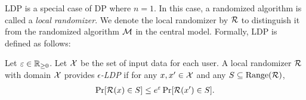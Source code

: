LDP \cite{Kasiviswanathan_FOCS08} is a special case of DP where $n=1$. 
In this case, a randomized algorithm is called a \textit{local randomizer}. 
We denote the local randomizer by $\mathcal{R}$ to distinguish it from the randomized algorithm $\mathcal{M}$ in the central model. 
Formally, LDP is defined as follows: 
\begin{definition}  \label{def:LDP} 
Let $\varepsilon \in \mathbb{R}_{\ge0}$. 
Let $\mathcal{X}$ be the set of input data for each user. 
A local randomizer $\mathcal{R}$ with domain $\mathcal{X}$ 
provides \emph{$\epsilon$-LDP} if for any $x,x' \in \mathcal{X}$ and any $S \subseteq \mathrm{Range}(\mathcal{R})$, 
\begin{align}
\Pr[\mathcal{R}(x) \in S] \leq e^\varepsilon \Pr[\mathcal{R}(x') \in S].
\label{eq:LDP}
\end{align}
\end{definition}

